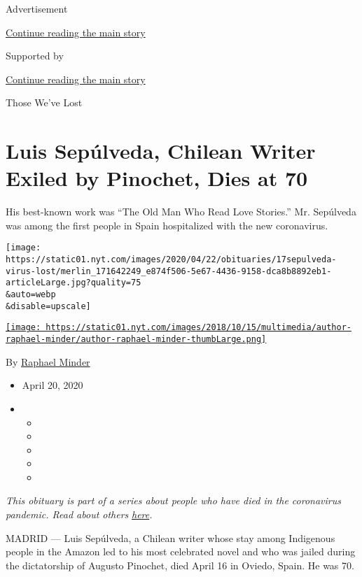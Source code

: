 Advertisement

\protect\hyperlink{after-top}{Continue reading the main story}

Supported by

\protect\hyperlink{after-sponsor}{Continue reading the main story}

Those We've Lost

\hypertarget{luis-sepuxfalveda-chilean-writer-exiled-by-pinochet-dies-at-70}{%
\section{Luis Sepúlveda, Chilean Writer Exiled by Pinochet, Dies at
70}\label{luis-sepuxfalveda-chilean-writer-exiled-by-pinochet-dies-at-70}}

His best-known work was ``The Old Man Who Read Love Stories.'' Mr.
Sepúlveda was among the first people in Spain hospitalized with the new
coronavirus.

\texttt{[image: https://static01.nyt.com/images/2020/04/22/obituaries/17sepulveda-virus-lost/merlin\_171642249\_e874f506-5e67-4436-9158-dca8b8892eb1-articleLarge.jpg?quality=75\\\&auto=webp\\\&disable=upscale]}

\href{https://www.nytimes.com/by/raphael-minder}{\texttt{[image: https://static01.nyt.com/images/2018/10/15/multimedia/author-raphael-minder/author-raphael-minder-thumbLarge.png]}}

By \href{https://www.nytimes.com/by/raphael-minder}{Raphael Minder}

\begin{itemize}
\item
  April 20, 2020
\item
  \begin{itemize}
  \item
  \item
  \item
  \item
  \item
  \end{itemize}
\end{itemize}

\emph{This obituary is part of a series about people who have died in
the coronavirus pandemic. Read about others}
\href{https://www.nytimes.com/series/people-who-have-died-of-the-coronavirus}{\emph{here}}\emph{.}

MADRID --- Luis Sepúlveda, a Chilean writer whose stay among Indigenous
people in the Amazon led to his most celebrated novel and who was jailed
during the dictatorship of Augusto Pinochet, died April 16 in Oviedo,
Spain. He was 70.

